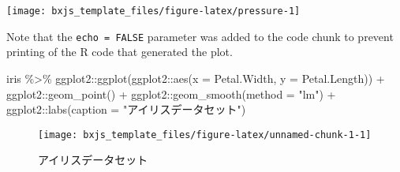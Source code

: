 \documentclass[
  12pt,
  a4paper,xelatex,ja=standard]{bxjsarticle}
\newenvironment{Shaded}{\begin{snugshade}}{\end{snugshade}}
\newcommand{\AttributeTok}[1]{\textcolor[rgb]{0.77,0.63,0.00}{#1}}
\newcommand{\FunctionTok}[1]{\textcolor[rgb]{0.00,0.00,0.00}{#1}}
\newcommand{\NormalTok}[1]{#1}
\newcommand{\SpecialCharTok}[1]{\textcolor[rgb]{0.00,0.00,0.00}{#1}}
\newcommand{\StringTok}[1]{\textcolor[rgb]{0.31,0.60,0.02}{#1}}
\begin{document}
\begin{center}\texttt{[image: bxjs\_template\_files/figure-latex/pressure-1]} \end{center}

Note that the \texttt{echo\ =\ FALSE} parameter was added to the code
chunk to prevent printing of the R code that generated the plot.

\newpage

\begin{Shaded}
\begin{Highlighting}[numbers=left,,]
\NormalTok{iris }\SpecialCharTok{\%\textgreater{}\%} 
\NormalTok{  ggplot2}\SpecialCharTok{::}\FunctionTok{ggplot}\NormalTok{(ggplot2}\SpecialCharTok{::}\FunctionTok{aes}\NormalTok{(}\AttributeTok{x =}\NormalTok{ Petal.Width, }\AttributeTok{y =}\NormalTok{ Petal.Length)) }\SpecialCharTok{+} 
\NormalTok{    ggplot2}\SpecialCharTok{::}\FunctionTok{geom\_point}\NormalTok{() }\SpecialCharTok{+} 
\NormalTok{    ggplot2}\SpecialCharTok{::}\FunctionTok{geom\_smooth}\NormalTok{(}\AttributeTok{method =} \StringTok{"lm"}\NormalTok{) }\SpecialCharTok{+}
\NormalTok{    ggplot2}\SpecialCharTok{::}\FunctionTok{labs}\NormalTok{(}\AttributeTok{caption =} \StringTok{"アイリスデータセット"}\NormalTok{)}
\end{Highlighting}
\end{Shaded}

\begin{figure}

{\centering \texttt{[image: bxjs\_template\_files/figure-latex/unnamed-chunk-1-1]} 

}

\caption{アイリスデータセット}\label{fig:unnamed-chunk-1}
\end{figure}
\end{document}
